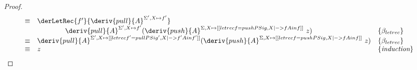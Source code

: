 \begin{proof}
\begin{align*}
\begin{array}{rll}
  \equiv & \derLetRec{f'}{\deriv{pull}{A}^{\Sigma',
                                 X \mapsto f' }}\\ & \qquad \qquad {{\deriv{pull}{A}^{\Sigma',
                                 X \mapsto f' }} ({{\deriv{push}{A}^{\Sigma, X \mapsto
           [[ letrec f = pushP {Sig, X |-> f} A in f ]] }}\ z})} &\{\beta_{letrec} \} \\
  \equiv & {{\deriv{pull}{A}^{\Sigma',
                                 X \mapsto [[ letrec f' = pullP {Sig', X |-> f'} A in f' ]] }} ({{\deriv{push}{A}^{\Sigma, X \mapsto
           [[ letrec f = pushP {Sig, X |-> f} A in f ]] }}\ z})} &\{\beta_{letrec} \} \\
\equiv & z & \{\textit{induction}\}
\end{array}
\end{align*}
\end{proof}

\pullPushInverse*


